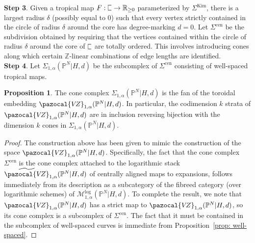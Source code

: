 \documentclass[11pt]{amsart}
\newcommand{\plC}{\scalebox{0.8}[1.3]{$\sqsubset$}}
\newcommand{\Z}{\mathbb{Z}}
\newcommand{\VZ}{\pazocal{V\!Z}}
\renewcommand{\to}{\rightarrow}
\theoremstyle{definition}
\newtheorem{prop}[thm]{Proposition}
\theoremstyle{definition}
\begin{document}
\noindent
\textbf{Step 3}. Given a tropical map $F: \plC\to \mathbb R_{\geq 0}$ parameterized by $\Sigma^{\mathrm{Kim}}$, there is a largest radius $\delta$ (possibly equal to $0$) such that every vertex strictly contained in the circle of radius $\delta$ around the core has degree-marking $d=0$. Let $
\Sigma^{\mathrm{cen}}$ be the subdivision obtained by requiring that the vertices contained within the circle of radius $\delta$ around the core of $\plC$ are totally ordered. This involves introducing cones along which certain $\Z$-linear combinations of edge lengths are identified.\\

\noindent
\textbf{Step 4}. Let $\Sigma_{1,\alpha}(\mathbb P^N|H,d)$ be the subcomplex of $\Sigma^{\mathrm{cen}}$ consisting of well-spaced tropical maps.

\begin{prop}
The cone complex $
\Sigma_{1,\alpha}(\mathbb P^N|H,d)$ is the fan of the toroidal embedding $
\VZ_{1,\alpha}(\mathbb P^N|H,d)$. In particular, the codimension $k$ strata of $
\VZ_{1,\alpha}(\mathbb P^N|H,d)$ are in inclusion reversing bijection with the dimension $k$ cones in $
\Sigma_{1,\alpha}(\mathbb P^N|H,d)$.
\end{prop}

\begin{proof}
The construction above has been given to mimic the construction of the space $
\VZ_{1,\alpha}(\mathbb P^N|H,d)$. Specifically, the fact that the cone complex $\Sigma^{\mathrm{cen}}$ is the cone complex attached to the logarithmic stack $\widetilde{\VZ}_{1,\alpha}(\mathbb P^N|H,d)$ of centrally aligned maps to expansions, follows immediately from its description as a subcategory of the fibreed category (over logarithmic schemes) of $\mathcal M^{\mathrm{log}}_{1,\alpha}(\mathbb P^N|H,d)$. To complete the result, we note that $
\VZ_{1,\alpha}(\mathbb P^N|H,d)$ has a strict map to $
\VZ_{1,\alpha}(\mathbb P^N|H,d)$, so its cone complex is a subcomplex of $\Sigma^{\mathrm{cen}}$. The fact that it must be contained in the subcomplex of well-spaced curves is immediate from Proposition~\ref{prop: well-spaced}.
\end{proof}
\end{document}
